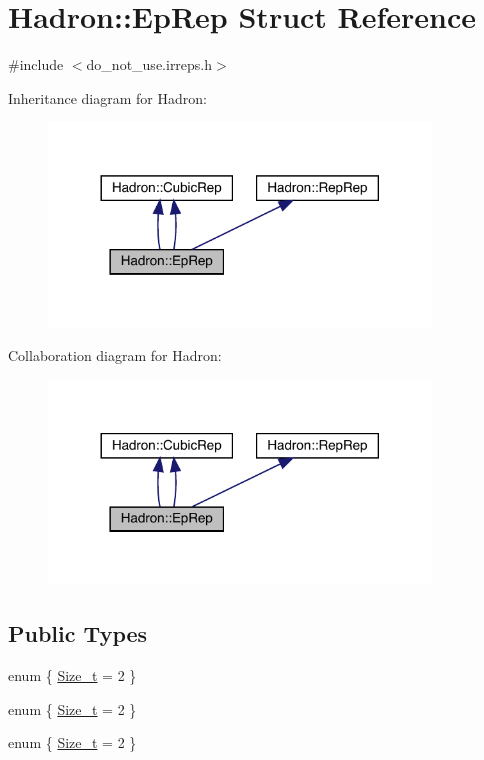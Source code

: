 \hypertarget{structHadron_1_1EpRep}{}\section{Hadron\+:\+:Ep\+Rep Struct Reference}
\label{structHadron_1_1EpRep}


{\ttfamily \#include $<$do\+\_\+not\+\_\+use.\+irreps.\+h$>$}



Inheritance diagram for Hadron\+:\nopagebreak
\begin{figure}[H]
\begin{center}
\leavevmode
\includegraphics[width=288pt]{d8/de2/structHadron_1_1EpRep__inherit__graph}
\end{center}
\end{figure}


Collaboration diagram for Hadron\+:\nopagebreak
\begin{figure}[H]
\begin{center}
\leavevmode
\includegraphics[width=288pt]{d0/d43/structHadron_1_1EpRep__coll__graph}
\end{center}
\end{figure}
\subsection*{Public Types}
\begin{DoxyCompactItemize}
\item 
enum \{ \mbox{\hyperlink{structHadron_1_1EpRep_a945027d359f892e9d281e86a25baa767aa251a0f4f8c253bf87c3c1d7104aa12a}{Size\+\_\+t}} = 2
 \}
\item 
enum \{ \mbox{\hyperlink{structHadron_1_1EpRep_a945027d359f892e9d281e86a25baa767aa251a0f4f8c253bf87c3c1d7104aa12a}{Size\+\_\+t}} = 2
 \}
\item 
enum \{ \mbox{\hyperlink{structHadron_1_1EpRep_a945027d359f892e9d281e86a25baa767aa251a0f4f8c253bf87c3c1d7104aa12a}{Size\+\_\+t}} = 2
 \}
\end{DoxyCompactItemize}
